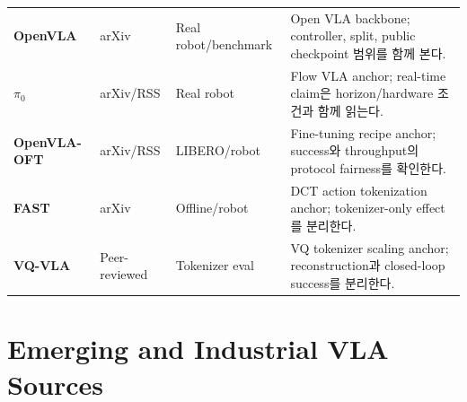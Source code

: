 \begin{table}[h]
\begin{tabularx}{\textwidth}{>{\bfseries}p{28mm}p{23mm}p{26mm}X}
    OpenVLA \citep{openvla} & arXiv & Real robot/benchmark & Open VLA backbone; controller, split, public checkpoint 범위를 함께 본다. \\
    \(\pi_0\) \citep{pi0} & arXiv/RSS & Real robot & Flow VLA anchor; real-time claim은 horizon/hardware 조건과 함께 읽는다. \\
    OpenVLA-OFT \citep{openvlaoft} & arXiv/RSS & LIBERO/robot & Fine-tuning recipe anchor; success와 throughput의 protocol fairness를 확인한다. \\
    FAST \citep{fast} & arXiv & Offline/robot & DCT action tokenization anchor; tokenizer-only effect를 분리한다. \\
    VQ-VLA \citep{vqvla} & Peer-reviewed & Tokenizer eval & VQ tokenizer scaling anchor; reconstruction과 closed-loop success를 분리한다. \\
    \bottomrule
  \end{tabularx}
\end{table}

\section{Emerging and Industrial VLA Sources}

